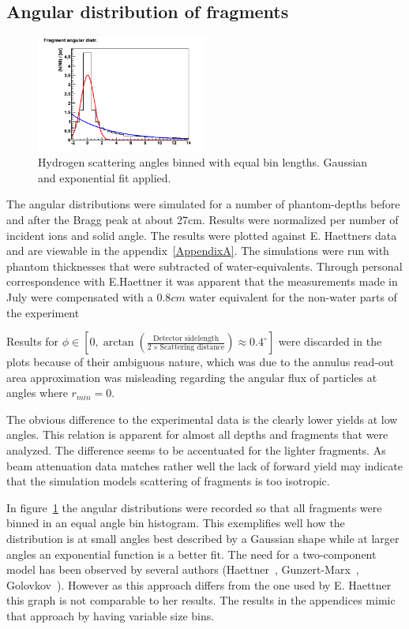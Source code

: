 \subsection{Angular distribution of fragments}
\begin{figure}[!h] 
\begin{center}
\includegraphics[width=0.5\textwidth]{images/plots/angularDistributions/equlBinnedHydrogen279.png}  
\caption{\label{fig:binnedHydrogen} Hydrogen scattering angles binned with equal bin lengths. Gaussian and exponential fit applied.}
 \end{center}
 \end{figure}
The angular distributions were simulated for a number of phantom-depths before and after the Bragg peak at about 27cm. Results were normalized per number of incident ions and solid angle. The results were plotted against E. Haettners data and are viewable in the appendix~\ref{AppendixA}. The simulations were run with phantom thicknesses that were subtracted of water-equivalents. Through personal correspondence with E.Haettner it was apparent that the measurements made in July were compensated with a $0.8 cm$ water equivalent for the non-water parts of the experiment

Results for $\phi \in [0,\arctan(\frac{\text{Detector sidelength}}{2 \times \text{Scattering distance}}) \approx 0.4^{\circ}]$ were discarded in the plots because of their ambiguous nature, which was due to the annulus read-out area approximation was misleading regarding the angular flux of particles at angles where $r_{min} = 0$.

The obvious difference to the experimental data is the clearly lower yields at low angles. This relation is apparent for almost all depths and fragments that were analyzed. The difference seems to be accentuated for the lighter fragments. As beam attenuation data matches rather well the lack of forward yield may indicate that the simulation models scattering of fragments is too isotropic.

In figure~\ref{fig:binnedHydrogen} the angular distributions were recorded so that all fragments were binned in an equal angle bin histogram. This exemplifies well how the distribution is at small angles best described by a Gaussian shape while at larger angles an exponential function is a better fit. The need for a two-component model has been observed by several authors (Haettner~\cite{ehaettner}, Gunzert-Marx~\cite{gunzert-marx}, Golovkov~\cite{golovkov}). However as this approach differs from the one used by E. Haettner this graph is not comparable to her results. The results in the appendices mimic that approach by having variable size bins.

